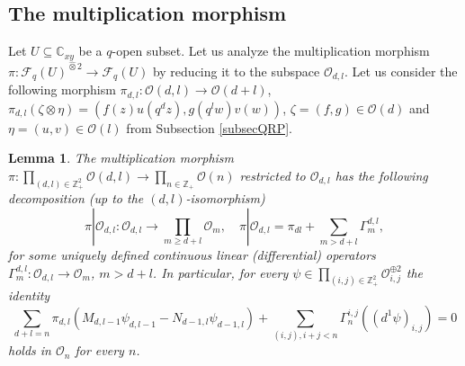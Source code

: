 \documentclass[12pt,reqno]{amsart}%
\theoremstyle{plain}
\newtheorem{lemma}{Lemma}
\numberwithin{theorem}{section} \numberwithin{equation}{section}
\numberwithin{lemma}{section}
\numberwithin{remark}{section}
\numberwithin{example}{section}
\numberwithin{proposition}{section}
\numberwithin{definition}{section}
\numberwithin{corollary}{section}
\begin{document}
\subsection{The multiplication morphism}

Let $U\subseteq\mathbb{C}_{xy}$ be a $q$-open subset. Let us analyze the
multiplication morphism $\pi:\mathcal{F}_{q}\left(  U\right)
^{\widehat{\otimes}2}\rightarrow\mathcal{F}_{q}\left(  U\right)  $ by reducing
it to the subspace $\mathcal{O}_{d,l}$. Let us consider the following morphism
$\pi_{d,l}:\mathcal{O}\left(  d,l\right)  \rightarrow\mathcal{O}\left(
d+l\right)  $, $\pi_{d,l}\left(  \zeta\otimes\eta\right)  =\left(  f\left(
z\right)  u\left(  q^{d}z\right)  ,g\left(  q^{l}w\right)  v\left(  w\right)
\right)  $, $\zeta=\left(  f,g\right)  \in\mathcal{O}\left(  d\right)  $ and
$\eta=\left(  u,v\right)  \in\mathcal{O}\left(  l\right)  $ from Subsection
\ref{subsecQRP}.

\begin{lemma}
\label{lemODL}The multiplication morphism $\pi:\prod\limits_{\left(
d,l\right)  \in\mathbb{Z}_{+}^{2}}\mathcal{O}\left(  d,l\right)
\longrightarrow\prod\limits_{n\in\mathbb{Z}_{+}}\mathcal{O}\left(  n\right)  $
restricted to $\mathcal{O}_{d,l}$ has the following decomposition (up to the
$\left(  d,l\right)  $-isomorphism)
\[
\pi|\mathcal{O}_{d,l}:\mathcal{O}_{d,l}\rightarrow\prod\limits_{m\geq
d+l}\mathcal{O}_{m},\quad\pi|\mathcal{O}_{d,l}=\pi_{dl}+\sum_{m>d+l}\Gamma
_{m}^{d,l},
\]
for some uniquely defined continuous linear (differential) operators
$\Gamma_{m}^{d,l}:\mathcal{O}_{d,l}\rightarrow\mathcal{O}_{m}$, $m>d+l$. In
particular, for every $\psi\in\prod\limits_{\left(  i,j\right)  \in
\mathbb{Z}_{+}^{2}}\mathcal{O}_{i,j}^{\oplus2}$ the identity
\[
\sum_{d+l=n}\pi_{d,l}\left(  M_{d,l-1}\psi_{d,l-1}-N_{d-1,l}\psi
_{d-1,l}\right)  +\sum_{\left(  i,j\right)  ,i+j<n}\Gamma_{n}^{i,j}\left(
\left(  d^{1}\psi\right)  _{i,j}\right)  =0
\]
holds in $\mathcal{O}_{n}$ for every $n$.
\end{lemma}
\end{document}
